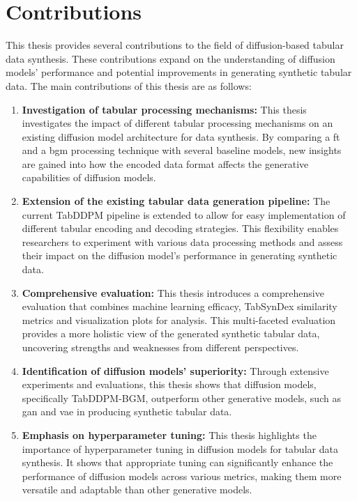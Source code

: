 \section{Contributions}
\label{ch:intro-contributions}
This thesis provides several contributions to the field of diffusion-based tabular data synthesis.
These contributions expand on the understanding of diffusion models' performance and potential improvements in generating synthetic tabular data.
The main contributions of this thesis are as follows:
\begin{enumerate}
	\item \textbf{Investigation of tabular processing mechanisms:}
	      This thesis investigates the impact of different tabular processing mechanisms on an existing diffusion model architecture for data synthesis.
	      By comparing a \acrfull{ft} and a \acrfull{bgm} processing technique with several baseline models, new insights are gained into how the encoded data format affects the generative capabilities of diffusion models.
	\item \textbf{Extension of the existing tabular data generation pipeline:}
	      The current TabDDPM \cite{kotelnikov2022TabDDPMModellingTabular} pipeline is extended to allow for easy implementation of different tabular encoding and decoding strategies.
	      This flexibility enables researchers to experiment with various data processing methods and assess their impact on the diffusion model's performance in generating synthetic data.
	\item \textbf{Comprehensive evaluation:}
	      This thesis introduces a comprehensive evaluation that combines machine learning efficacy,
	      TabSynDex similarity metrics and visualization plots for analysis.
	      This multi-faceted evaluation provides a more holistic view of the generated synthetic tabular data,
	      uncovering strengths and weaknesses from different perspectives.
	\item \textbf{Identification of diffusion models' superiority:}
	      Through extensive experiments and evaluations, this thesis shows that diffusion models, specifically TabDDPM-BGM, outperform other generative models, such as \gls{gan} and \gls{vae} in producing synthetic tabular data.
	\item \textbf{Emphasis on hyperparameter tuning:}
	      This thesis highlights the importance of hyperparameter tuning in diffusion models for tabular data synthesis.
	      It shows that appropriate tuning can significantly enhance the performance of diffusion models across various metrics,
	      making them more versatile and adaptable than other generative models.
\end{enumerate}

